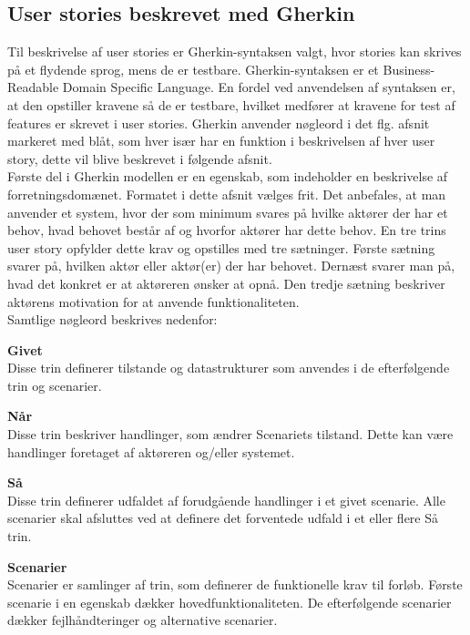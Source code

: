 \subsection{User stories beskrevet med Gherkin}
Til beskrivelse af user stories er Gherkin-syntaksen\cite{Gherkin} valgt, hvor stories 
kan skrives på et flydende sprog, mens de er testbare. Gherkin-syntaksen er et Business-Readable Domain  
Specific Language. En fordel ved anvendelsen af syntaksen er, at den opstiller kravene så de er testbare, hvilket medfører at kravene for test af features er skrevet i user stories.
Gherkin anvender nøgleord i det flg. afsnit 
markeret med blåt,  som hver især har en funktion i beskrivelsen af hver 
user story, dette vil blive beskrevet i følgende afsnit.  \vspace{0.2 cm}\\
Første del i Gherkin modellen er en egenskab, som indeholder en beskrivelse af forretningsdomænet. 
Formatet i	dette afsnit vælges frit. Det anbefales, at man anvender et 
system, hvor der som minimum svares på hvilke aktører der har et behov, hvad 
behovet består af og hvorfor aktører har dette behov. En tre trins user 
story opfylder dette krav og opstilles med tre 
sætninger. Første sætning svarer på, hvilken aktør eller aktør(er) der har
behovet. Dernæst svarer man på, hvad det konkret er at aktøreren ønsker at 
opnå. Den tredje sætning beskriver aktørens motivation for at anvende 
funktionaliteten. \\
Samtlige nøgleord beskrives nedenfor:

\large{\textbf{Givet}}\\
Disse trin definerer tilstande og datastrukturer som anvendes i de 
efterfølgende trin og scenarier.

\large{\textbf{Når}}\\
Disse trin beskriver handlinger, som ændrer Scenariets tilstand. Dette kan 
være handlinger	foretaget af aktøreren og/eller systemet.

\large{\textbf{Så}}\\
Disse trin definerer udfaldet af forudgående handlinger i et givet 
scenarie. Alle scenarier skal afsluttes ved at definere det forventede 
udfald i et eller flere Så trin.

\large{\textbf{Scenarier}}\\
Scenarier er samlinger af trin, som definerer de funktionelle krav til 
forløb. Første scenarie i en egenskab dækker hovedfunktionaliteten. De 
efterfølgende scenarier dækker fejlhåndteringer og alternative scenarier.

